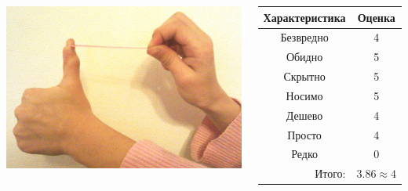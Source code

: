 \begin{frame} %
    \begin{columns}
            \begin{center}
                \includegraphics[width=\textwidth]{fig/elastic}
            \end{center}
            
            \begin{center}
                \begin{tabular}{c|c}
                    \hline\hline
                    Характеристика              & Оценка\\ \hline\hline
                    Безвредно                   & 4 \\
                    Обидно                      & 5 \\
                    Скрытно                     & 5 \\
                    Носимо                      & 5 \\
                    Дешево                      & 4 \\
                    Просто                      & 4 \\ 
                    Редко                       & 0 \\ \hline
                    \multicolumn{1}{r|}{Итого:} & $3.86\approx 4$ \\
                \end{tabular}
            \end{center}
    \end{columns}    
\end{frame}

